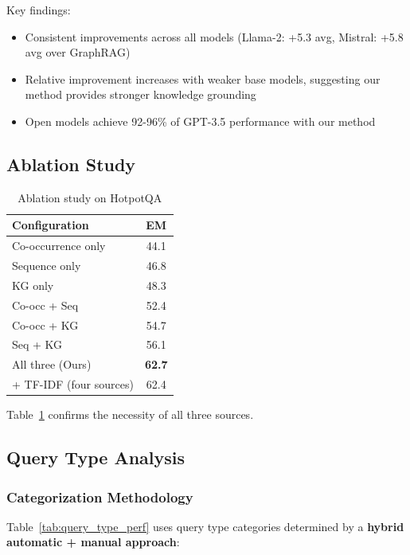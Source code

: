 \documentclass[10pt,twocolumn]{article}
\begin{document}
Key findings:
\begin{itemize}
    \item Consistent improvements across all models (Llama-2: +5.3 avg, Mistral: +5.8 avg over GraphRAG)
    \item Relative improvement increases with weaker base models, suggesting our method provides stronger knowledge grounding
    \item Open models achieve 92-96\% of GPT-3.5 performance with our method
\end{itemize}


\subsection{Ablation Study}

\begin{table}[t]
\centering
\caption{Ablation study on HotpotQA}
\label{tab:ablation}
\small
\begin{tabular}{@{}lc@{}}
\toprule
\textbf{Configuration} & \textbf{EM} \\
\midrule
Co-occurrence only & 44.1 \\
Sequence only & 46.8 \\
KG only & 48.3 \\
\midrule
Co-occ + Seq & 52.4 \\
Co-occ + KG & 54.7 \\
Seq + KG & 56.1 \\
\midrule
All three (Ours) & \textbf{62.7} \\
+ TF-IDF (four sources) & 62.4 \\
\bottomrule
\end{tabular}
\end{table}

Table~\ref{tab:ablation} confirms the necessity of all three sources.


\subsection{Query Type Analysis}
\label{sec:query_types}

\subsubsection{Categorization Methodology}

Table~\ref{tab:query_type_perf} uses query type categories determined by a \textbf{hybrid automatic + manual approach}:
\end{document}

